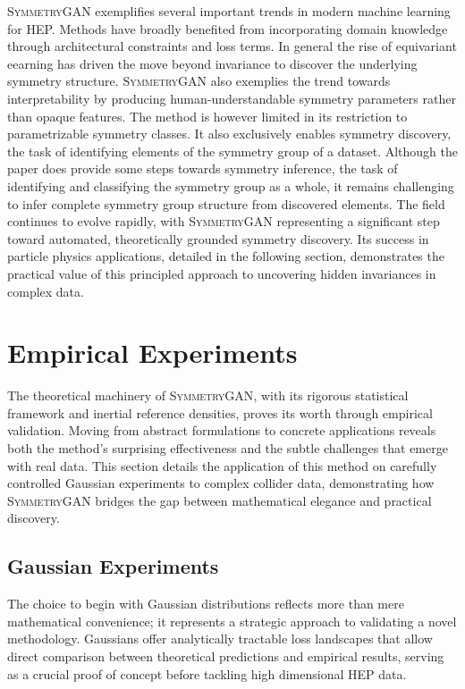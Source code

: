         \textsc{SymmetryGAN} exemplifies several important trends in modern machine learning for HEP.
        Methods have broadly benefited from incorporating domain knowledge through architectural constraints and loss terms.
        In general the rise of equivariant eearning has driven the move beyond invariance to discover the underlying symmetry structure.
        \textsc{SymmetryGAN} also exemplies the trend towards interpretability by producing human-understandable symmetry parameters rather than opaque features.
        The method is however limited in its restriction to parametrizable symmetry classes.
        It also exclusively enables symmetry discovery, the task of identifying elements of the symmetry group of a dataset.
        Although the paper does provide some steps towards symmetry inference, the task of identifying and classifying the symmetry group as a whole, it remains challenging to infer complete symmetry group structure from discovered elements.
        The field continues to evolve rapidly, with \textsc{SymmetryGAN} representing a significant step toward automated, theoretically grounded symmetry discovery.
        Its success in particle physics applications, detailed in the following section, demonstrates the practical value of this principled approach to uncovering hidden invariances in complex data.

\section{Empirical Experiments}
        The theoretical machinery of \textsc{SymmetryGAN}, with its rigorous statistical framework and inertial reference densities, proves its worth through empirical validation.
        Moving from abstract formulations to concrete applications reveals both the method's surprising effectiveness and the subtle challenges that emerge with real data.
        This section details the application of this method on carefully controlled Gaussian experiments to complex collider data, demonstrating how \textsc{SymmetryGAN} bridges the gap between mathematical elegance and practical discovery.

        \subsection{Gaussian Experiments}
            The choice to begin with Gaussian distributions reflects more than mere mathematical convenience; it represents a strategic approach to validating a novel methodology.
            Gaussians offer analytically tractable loss landscapes that allow direct comparison between theoretical predictions and empirical results, serving as a crucial proof of concept before tackling high dimensional HEP data.

